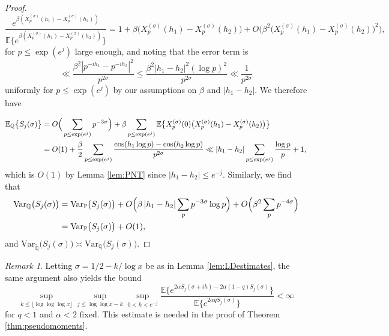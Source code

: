 \documentclass{amsart}
\theoremstyle{definition}
\theoremstyle{remark}
\newtheorem{remark}[theorem]{Remark}
\numberwithin{equation}{section}
\begin{document}
\begin{proof}
\[
    \frac{e^{\beta (X_p^{(\sigma)}(h_1)-X_p^{(\sigma)}(h_2))}}{\mathbb{E}\big\{e^{\beta (X_p^{(\sigma)}(h_1)-X_p^{(\sigma)}(h_2))}\big\}}=1+\beta \big(X_p^{(\sigma)}(h_1)-X_p^{(\sigma)}(h_2)\big)+O\Big(\beta^2 \big(X_p^{(\sigma)}(h_1)-X_p^{(\sigma)}(h_2)\big)^2\Big),
\]
for $p\leq \exp(e^j)$ large enough, and noting that the error term is
\[
   \ll  \frac{\beta^2|p^{-ih_1}-p^{-ih_2}|^2}{p^{2\sigma}} \leq \frac{\beta^2|h_1-h_2|^2(\log p)^2}{p^{2\sigma}} \ll \frac{1}{p^{2\sigma}}
\]
uniformly for $p\leq \exp(e^j)$ by our assumptions on $\beta$ and $|h_1-h_2|$. We therefore have

\begin{align}\label{eq:meanshift}
    \mathbb{E}_{\mathbb{Q}}\big\{S_j(\sigma)\big\} 
    &= O\Big(\sum_{p\leq \exp(e^j)} p^{-3\sigma}\Big)+\beta\sum_{p\leq \exp(e^j)} \mathbb{E}\big\{X_p^{(\sigma)}(0)\big(X_p^{(\sigma)}(h_1)-X_p^{(\sigma)}(h_2)\big)\big\}\notag\\
    &=O(1)+\frac{\beta}{2}\sum_{p\leq \exp(e^j)}
    \frac{\cos(h_1\log p)-\cos(h_2\log p)}{p^{2\sigma}}  \ll |h_1-h_2|\sum_{p\leq \exp(e^j)} \frac{\log p}{p} +1,
\end{align}
which is $O(1)$ by Lemma \ref{lem:PNT} since $|h_1-h_2|\leq e^{-j}$. Similarly, we find that
\begin{align}
    \mathrm{Var}_{\mathbb{Q}}\big(S_j(\sigma)\big)
    &= \mathrm{Var}_{\mathbb{P}}\big(S_j(\sigma)\big)
    + O\Big(\beta\,|h_1-h_2|\sum_{p} p^{-3\sigma}\log p\Big)
    + O\Big(\beta^2\sum_{p} p^{-4\sigma}\Big) \notag\\
    &= \mathrm{Var}_{\mathbb{P}}\big(S_j(\sigma)\big) + O(1),\label{eq:Qvar}
\end{align}
and $\mathrm{Var}_{\tilde{\mathbb{Q}}}\big(S_j(\sigma)\big)\asymp \mathrm{Var}_{\mathbb{Q}}\big(S_j(\sigma)\big)$.
\qedhere
\end{proof}
\begin{remark}
Letting $\sigma=1/2-k/\log x$ be as in Lemma \ref{lem:LDestimates}, the same argument also yields the bound
\begin{equation}\label{eq:ERRORBOUND}
    \sup_{k\leq \lfloor\log\log\log x\rfloor}\sup_{j\leq \log\log x-k}\sup_{0<h<e^{-j}}\frac{\mathbb{E}\big\{e^{2\alpha S_j(\sigma+ih)-2\alpha(1-q)S_j(\sigma)}\big\}}{\mathbb{E}\big\{e^{2\alpha q S_j(\sigma)}\big\}} <\infty
\end{equation}
for $q<1$ and $\alpha<2$ fixed. This estimate is needed in the proof of Theorem \ref{thm:pseudomoments}.
\end{remark}
\end{document}
